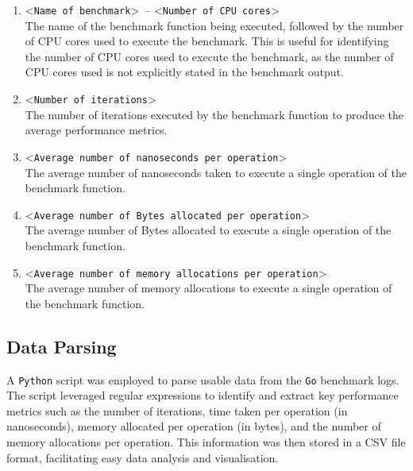 \begin{enumerate}
    \item \textless\lstinline{Name of benchmark}\textgreater\ -- \textless\lstinline{Number of CPU cores}\textgreater\\The name of the benchmark function being executed, followed by the number of CPU cores used to execute the benchmark. This is useful for identifying the number of CPU cores used to execute the benchmark, as the number of CPU cores used is not explicitly stated in the benchmark output.
    \item \textless\lstinline{Number of iterations}\textgreater\\The number of iterations executed by the benchmark function to produce the average performance metrics.
    \item \textless\lstinline{Average number of nanoseconds per operation}\textgreater\\The average number of nanoseconds taken to execute a single operation of the benchmark function.
    \item \textless\lstinline{Average number of Bytes allocated per operation}\textgreater\\The average number of Bytes allocated to execute a single operation of the benchmark function.
    \item \textless\lstinline{Average number of memory allocations per operation}\textgreater\\The average number of memory allocations to execute a single operation of the benchmark function.
\end{enumerate}

\subsection*{Data Parsing}
A \lstinline{Python} script was employed to parse usable data from the \lstinline{Go} benchmark logs. The script leveraged regular expressions to identify and extract key performance metrics such as the number of iterations, time taken per operation (in nanoseconds), memory allocated per operation (in bytes), and the number of memory allocations per operation. This information was then stored in a CSV file format, facilitating easy data analysis and visualisation.

